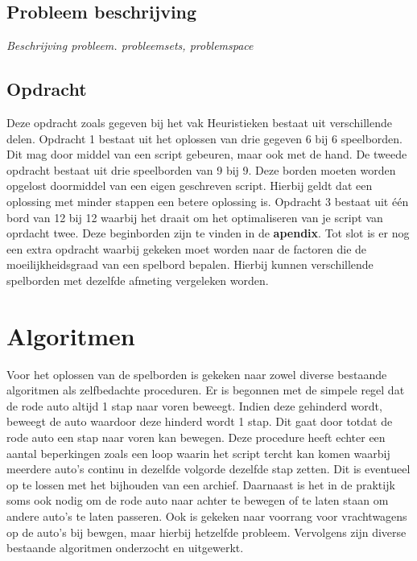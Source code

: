 \documentclass[a4paper]{article}
\begin{document}
\subsection{Probleem beschrijving}
\textit{Beschrijving probleem. probleemsets, problemspace}

\subsection{Opdracht}
Deze opdracht zoals gegeven bij het vak Heuristieken bestaat uit verschillende delen. Opdracht 1 bestaat uit het oplossen van drie gegeven 6 bij 6 speelborden. Dit mag door middel van een script gebeuren, maar ook met de hand. De tweede opdracht bestaat uit drie speelborden van 9 bij 9. Deze borden moeten worden opgelost doormiddel van een eigen geschreven script. Hierbij geldt dat een oplossing met minder stappen een betere oplossing is. Opdracht 3 bestaat uit één bord van 12 bij 12 waarbij het draait om het optimaliseren van je script van oprdacht twee. Deze beginborden zijn te vinden in de \textbf{apendix}. Tot slot is er nog een extra opdracht waarbij gekeken moet worden naar de factoren die de moeilijkheidsgraad van een spelbord bepalen. Hierbij kunnen verschillende spelborden met dezelfde afmeting vergeleken worden.

\section{Algoritmen}
Voor het oplossen van de spelborden is gekeken naar zowel diverse bestaande algoritmen als zelfbedachte proceduren. Er is begonnen met de simpele regel dat de rode auto altijd 1 stap naar voren beweegt. Indien deze gehinderd wordt, beweegt de auto waardoor deze hinderd wordt 1 stap. Dit gaat door totdat de rode auto een stap naar voren kan bewegen. Deze procedure heeft echter een aantal beperkingen zoals een loop waarin het script tercht kan komen waarbij meerdere auto's continu in dezelfde volgorde dezelfde stap zetten. Dit is eventueel op te lossen met het bijhouden van een archief. Daarnaast is het in de praktijk soms ook nodig om de rode auto naar achter te bewegen of te laten staan om andere auto's te laten passeren. Ook is gekeken naar voorrang voor vrachtwagens op de auto's bij bewgen, maar hierbij hetzelfde probleem. Vervolgens zijn diverse bestaande algoritmen onderzocht en uitgewerkt.
\end{document}
